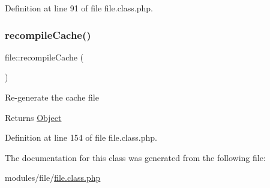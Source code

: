 Definition at line 91 of file file.\+class.\+php.

\mbox{\label{classfile_abdd4624fd45f101cdf4009eeda3cc1ab}} 
\subsubsection{\texorpdfstring{recompile\+Cache()}{recompileCache()}}
{\footnotesize\ttfamily file\+::recompile\+Cache (\begin{DoxyParamCaption}{ }\end{DoxyParamCaption})}

Re-\/generate the cache file

\begin{DoxyReturn}{Returns}
\hyperlink{classObject}{Object} 
\end{DoxyReturn}


Definition at line 154 of file file.\+class.\+php.



The documentation for this class was generated from the following file\+:\begin{DoxyCompactItemize}
\item 
modules/file/\hyperlink{file_8class_8php}{file.\+class.\+php}\end{DoxyCompactItemize}
